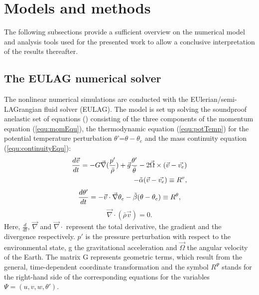 \chapter{Models and methods}

The following subsections provide a sufficient overview on the numerical model and analysis tools used for the presented work to allow a conclusive interpretation of the results thereafter.

\section{The EULAG numerical solver}
\label{sec:EULAG}

The nonlinear numerical simulations are conducted with the EUlerian/semi- LAGrangian fluid solver (EULAG). The model is set up solving the soundproof anelastic set of equations (\cite{lipps_scale_1982}) consisting of the three components of the momentum equation (\ref{equ:momEqu}), the thermodynamic equation (\ref{equ:potTemp}) for the potential temperature perturbation $\theta$'=$\theta-\theta_e$ and the mass continuity equation (\ref{equ:continuityEqu}):
%
\begin{equation}
\begin{aligned}
    \frac{d \Vec{v}}{dt} = -G \Vec{\nabla} (\frac{p'}{\bar{\rho}}) +  \Vec{g} \frac{\theta'}{\bar{\theta}} - 2 \Vec{\Omega} \times (\Vec{v}-\Vec{v_e}) \\
    - \Tilde{\alpha} (\Vec{v}-\Vec{v_e}) \equiv R^{v},
    \label{equ:momEqu}
\end{aligned}
\end{equation}
%
\begin{equation}
    \frac{d \theta'}{dt} = -\Vec{v} \cdot \Vec{\nabla} \theta_e - \Tilde{\beta} (\theta-\theta_e) \equiv R^{\theta},
    \label{equ:potTemp}
\end{equation}
%
\begin{equation}
    \Vec{\nabla} \cdot (\bar{\rho} \Vec{v}) = 0.
    \label{equ:continuityEqu}
\end{equation}
%
Here, $\frac{d}{dt}$, $\Vec{\nabla}$ and $\Vec{\nabla} \cdot$ represent the total derivative, the gradient and the divergence respectively. $p'$ is the pressure perturbation with respect to the environmental state, g the gravitational acceleration and $\Vec{\Omega}$ the angular velocity of the Earth. The matrix G represents geometric terms, which result from the general, time-dependent coordinate transformation and the symbol $R^{\Psi}$ stands for the right-hand side of the corresponding equations for the variables $\Psi = (u,v,w,\theta')$.

